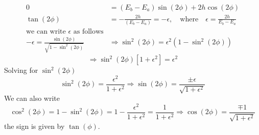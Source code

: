 \documentclass[12 pt]{article}
\numberwithin{equation}{section}
\begin{document}
\begin{enumerate}[a)]
\begin{equation*}
\begin{aligned}
  0 &= (E_b - E_a)\sin(2\phi) + 2h\cos(2\phi)\\
  \tan(2\phi)&= -\frac{2h}{(E_b - E_a)} = -\epsilon,\quad \text{where}\quad 
  \epsilon = \frac{2h}{E_b- E_a}\\
  \text{we can write } \epsilon \,\,\text{as follows}\\
  -\epsilon = \frac{\sin(2\phi)}{\sqrt{1-\sin^2(2\phi)}} &\Rightarrow \sin^2(2\phi) = \epsilon^2
  (1 - \sin^2(2\phi))
\end{aligned}
\end{equation*}
\[
\Rightarrow \sin^2(2\phi)[1+\epsilon^2] = \epsilon^2 
\]
Solving for $\sin^2(2\phi)$
\begin{equation}\label{eq314}
\sin^2(2\phi) = \frac{\epsilon^2}{1+\epsilon^2} \Rightarrow \sin(2\phi) = \frac{\pm \epsilon}
{\sqrt{1+\epsilon^2}}
\end{equation}
We can also write 
\begin{equation}\label{eq315}
  \cos^2(2\phi) = 1 - \sin^2(2\phi) = 1 - \frac{\epsilon^2}{1+\epsilon^2} = \frac{1}
  {1+\epsilon^2} \Rightarrow \cos(2\phi) = \frac{\mp 1}{\sqrt{1+\epsilon^2}}
\end{equation}
the sign is given by $\tan(\phi)$.


\end{enumerate}
\end{document}
